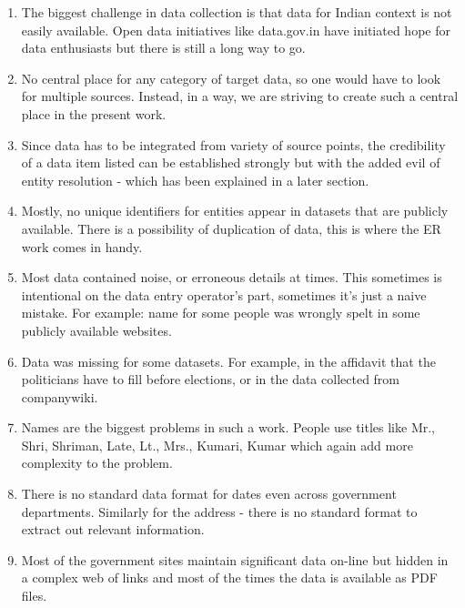 \begin{enumerate}

    \item  The biggest challenge in data collection is that data for Indian context is not easily available.  Open data initiatives like data.gov.in have initiated hope for data enthusiasts but there is still a long way to go. 

    \item No central place for any category of target data, so one would have to look for multiple sources. Instead, in a way, we are striving to create such a central place in the present work.

    \item Since data has to be integrated from variety of source points, the credibility of a data item listed can be established strongly but with the added evil of entity resolution - which has been explained in a later section. 

    \item Mostly, no unique identifiers for entities appear in datasets that are publicly available. There is a possibility of duplication of data, this is where the ER work comes in handy.  

    \item Most data contained noise, or erroneous details at times. This sometimes is intentional on the data entry operator's part, sometimes it's just a naive mistake. For example: name for some people was wrongly spelt in some publicly available websites.

    \item Data was missing for some datasets. For example, in the affidavit that the politicians have to fill before elections, or in the data collected from companywiki.

    \item Names are the biggest problems in such a work. People use titles like Mr., Shri, Shriman, Late, Lt., Mrs., Kumari, Kumar which again add more complexity to the problem. 

    \item There is no standard data format for dates even across government departments. Similarly for the address - there is no standard format to extract out relevant information.

    \item Most of the government sites maintain significant data on-line but hidden in a complex web of links and most of the times the data is available as PDF files.


\end{enumerate}



